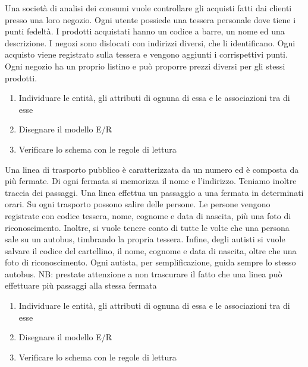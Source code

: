 \documentclass[addpoints]{exam}
\begin{document}
 
\begin{center}
\end{center}
 
\vspace{5mm}
 
 
\vspace{5mm}
 
 
\begin{questions}
	
\question[5]Una società di analisi dei consumi vuole controllare gli acquisti fatti dai clienti presso una loro negozio. Ogni utente possiede una tessera personale dove tiene i punti fedeltà. I prodotti acquistati hanno un codice a barre, un nome ed una descrizione. I negozi sono dislocati con indirizzi diversi, che li identificano. Ogni acquisto viene registrato sulla tessera e vengono aggiunti i corrispettivi punti. Ogni negozio ha un proprio listino e può proporre prezzi diversi per gli stessi prodotti.

\begin{enumerate}
	\item Individuare le entità, gli attributi di ognuna di essa e le associazioni tra di esse
	\item Disegnare il modello E/R
	\item Verificare lo schema con le regole di lettura
\end{enumerate}
 
\question[5] 	Una linea di trasporto pubblico è caratterizzata da un numero ed è composta da più fermate. Di ogni fermata si memorizza il nome e l’indirizzo. Teniamo inoltre traccia dei passaggi. Una linea effettua un passaggio a una fermata in determinati orari. Su ogni trasporto possono salire delle persone. Le persone vengono registrate con codice tessera, nome, cognome e data di nascita, più una foto di riconoscimento. Inoltre, si vuole tenere conto di tutte le volte che una persona sale su un autobus, timbrando la propria tessera. Infine, degli autisti si vuole salvare il codice del cartellino, il nome, cognome e data di nascita, oltre che una foto di riconoscimento. Ogni autista, per semplificazione, guida sempre lo stesso autobus. NB: prestate attenzione a non trascurare il fatto che una linea può effettuare più passaggi alla stessa fermata
\begin{enumerate}
	\item Individuare le entità, gli attributi di ognuna di essa e le associazioni tra di esse
	\item Disegnare il modello E/R
	\item Verificare lo schema con le regole di lettura
\end{enumerate}

\end{questions}

\begin{center}
	\gradetable[h][questions]
\end{center}
\end{document}
